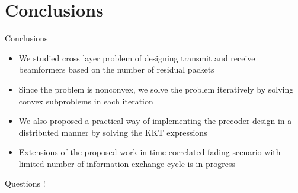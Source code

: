 \documentclass[9pt]{beamer}
\begin{document}
\section{Conclusions}

\begin{frame}{Conclusions}
\begin{itemize}
\item We studied cross layer problem of designing transmit and receive beamformers based on the number of residual packets
\item Since the problem is nonconvex, we solve the problem iteratively by solving convex subproblems in each iteration
\item We also proposed a practical way of implementing the precoder design in a distributed manner by solving the \ac{KKT} expressions
\item Extensions of the proposed work in time-correlated fading scenario with limited number of information exchange cycle is in progress
\end{itemize}
\end{frame}


\begin{frame}
\begin{center}
{\color{blue}\Huge{Questions !}}
\end{center}
\end{frame}
\end{document}
